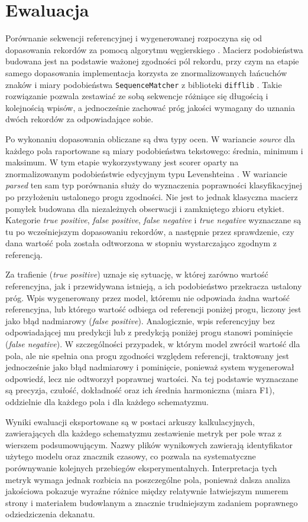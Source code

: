 \section{Ewaluacja}\label{sec:ewaluacja}

Porównanie sekwencji referencyjnej i wygenerowanej rozpoczyna się od dopasowania rekordów za pomocą algorytmu węgierskiego \parencite{kuhn1955hungarian}.
Macierz podobieństwa budowana jest na podstawie ważonej zgodności pól rekordu, przy czym na etapie samego dopasowania implementacja korzysta ze znormalizowanych łańcuchów znaków i miary podobieństwa \texttt{SequenceMatcher} z biblioteki \texttt{difflib} \parencite{python_difflib_2026}.
Takie rozwiązanie pozwala zestawiać ze sobą sekwencje różniące się długością i kolejnością wpisów, a jednocześnie zachować próg jakości wymagany do uznania dwóch rekordów za odpowiadające sobie.

Po wykonaniu dopasowania obliczane są dwa typy ocen.
W wariancie \textit{source} dla każdego pola raportowane są miary podobieństwa tekstowego: średnia, minimum i maksimum.
W tym etapie wykorzystywany jest scorer oparty na znormalizowanym podobieństwie edycyjnym typu Levenshteina \parencite{wagner1974string}.
W wariancie \textit{parsed} ten sam typ porównania służy do wyznaczenia poprawności klasyfikacyjnej po przyłożeniu ustalonego progu zgodności.
Nie jest to jednak klasyczna macierz pomyłek budowana dla niezależnych obserwacji i zamkniętego zbioru etykiet.
Kategorie \textit{true positive}, \textit{false positive}, \textit{false negative} i \textit{true negative} wyznaczane są tu po wcześniejszym dopasowaniu rekordów, a następnie przez sprawdzenie, czy dana wartość pola została odtworzona w stopniu wystarczająco zgodnym z referencją.

Za trafienie (\textit{true positive}) uznaje się sytuację, w której zarówno wartość referencyjna, jak i przewidywana istnieją, a ich podobieństwo przekracza ustalony próg.
Wpis wygenerowany przez model, któremu nie odpowiada żadna wartość referencyjna, lub którego wartość odbiega od referencji poniżej progu, liczony jest jako błąd nadmiarowy (\textit{false positive}).
Analogicznie, wpis referencyjny bez odpowiadającej mu predykcji lub z predykcją poniżej progu stanowi pominięcie (\textit{false negative}).
W szczególności przypadek, w którym model zwrócił wartość dla pola, ale nie spełnia ona progu zgodności względem referencji, traktowany jest jednocześnie jako błąd nadmiarowy i pominięcie, ponieważ system wygenerował odpowiedź, lecz nie odtworzył poprawnej wartości.
Na tej podstawie wyznaczane są precyzja, czułość, dokładność oraz ich średnia harmoniczna (miara F1), oddzielnie dla każdego pola i dla każdego schematyzmu.

Wyniki ewaluacji eksportowane są w postaci arkuszy kalkulacyjnych, zawierających dla każdego schematyzmu zestawienie metryk per pole wraz z wierszem podsumowującym.
Nazwy plików wynikowych zawierają identyfikator użytego modelu oraz znacznik czasowy, co pozwala na systematyczne porównywanie kolejnych przebiegów eksperymentalnych.
Interpretacja tych metryk wymaga jednak rozbicia na poszczególne pola, ponieważ dalsza analiza jakościowa pokazuje wyraźne różnice między relatywnie łatwiejszym numerem strony i materiałem budowlanym a znacznie trudniejszym zadaniem poprawnego odziedziczenia dekanatu.
